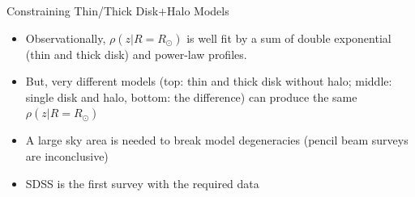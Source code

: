 \documentclass[letterpaper,landscape]{slides}
\begin{document}
\begin{slide}
{\begin{minipage}[t]{20cm}
\begin{center}
\vskip -1in
{\large \color{red} Constraining Thin/Thick Disk$+$Halo Models}
\end{center}
\begin{itemize}
\item
{\color{red} Observationally,} $\rho(z|R=R_\odot)$ is well fit by {\color{blue} 
a sum of double exponential (thin and thick disk) and power-law} profiles. 
\item
But, very {\color{blue} different models} (top: thin and thick disk 
without halo; middle: single disk and halo, bottom: the difference) {\color{blue} 
can produce the same $\rho(z|R=R_\odot)$}
\item
{\color{blue}A large sky area is needed to break model degeneracies} (pencil
beam surveys are inconclusive)
\item {\color{red} SDSS is the first survey with the required data}
\end{itemize}     
\vskip 0.1in

\end{minipage}}
\vfill 
\end{slide}
\end{document}
